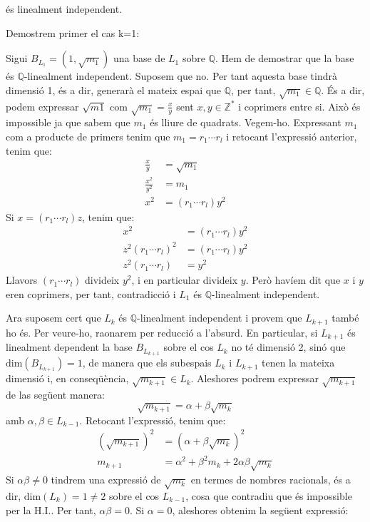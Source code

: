 \documentclass[11pt,a4paper]{article}
\begin{document}
\begin{enumerate}
\begin{enumerate}
és linealment independent.\par Demostrem primer el cas k=1:\par Sigui $B_{L_1}=(1,\sqrt{m_1})$ una base de $L_1$ sobre $\mathbb{Q}$. Hem de demostrar que la base és  $\mathbb{Q}$-linealment independent. Suposem que no. Per tant aquesta base tindrà dimensió 1, és a dir, generarà el mateix espai que $\mathbb{Q}$, per tant, $\sqrt{m_1}\in \mathbb{Q}$. És a dir, podem expressar $\sqrt{m1}$ com $\sqrt{m_1}=\frac{x}{y}$ sent $x, y \in \mathbb{Z}^\ast$ i coprimers entre si. Això és impossible ja que sabem que $m_1$ és lliure de quadrats. Vegem-ho. Expressant $m_1$ com a producte de primers tenim que $m_1=r_1\cdots r_l$ i retocant l'expressió anterior, tenim que:
        \begin{align*}
            \frac{x}{y}&=\sqrt{m_1} \\
            \frac{x^2}{y^2}&=m_1\\
            x^2&=(r_1\cdots r_l)y^2
        \end{align*}
        Si $x=(r_1\cdots r_l)z$, tenim que:
        \begin{align*}
            x^2&=(r_1\cdots r_l)y^2\\
            z^2(r_1\cdots r_l)^2&=(r_1\cdots r_l)y^2\\
            z^2(r_1\cdots r_l)&=y^2
        \end{align*}
        Llavors $(r_1\cdots r_l)$ divideix $y^2$, i en particular divideix $y$. Però havíem dit que $x$ i $y$ eren coprimers, per tant, contradicció i $L_1$ és $\mathbb{Q}$-linealment independent.\par Ara suposem cert que $L_k$ és $\mathbb{Q}$-linealment independent i provem que $L_{k+1}$ també ho és. Per veure-ho, raonarem per reducció a l'absurd. En particular, si $L_{k+1}$ és linealment dependent la base $B_{L_{k+1}}$ sobre el cos $L_k$ no té dimensió 2, sinó que $\text{dim} (B_{L_{k+1}})=1$, de manera que els subespais $L_k$ i $L_{k+1}$ tenen la mateixa dimensió i, en conseqüència, $\sqrt{m_{k+1}}\in L_k$. Aleshores podrem expressar $\sqrt{m_{k+1}}$ de las següent manera:
        $$\sqrt{m_{k+1}}=\alpha + \beta \sqrt{m_k}$$ amb $\alpha,\beta \in L_{k-1}$. Retocant l'expressió, tenim que:
        \begin{align*}
            (\sqrt{m_{k+1}})^2&=(\alpha + \beta \sqrt{m_k})^2\\
            m_{k+1}&=\alpha^2+\beta^2m_k+2\alpha\beta\sqrt{m_k}
        \end{align*}
        Si $\alpha\beta\neq 0$ tindrem una expressió de $\sqrt{m_k}$ en termes de nombres racionals, és a dir, $\text{dim} (L_k)=1\neq 2$ sobre el cos $L_{k-1}$, cosa que contradiu que és impossible per la H.I.. Per tant, $\alpha\beta= 0$. Si $\alpha=0$, aleshores obtenim la següent expressió:

\end{enumerate}
\end{enumerate}
\end{document}

